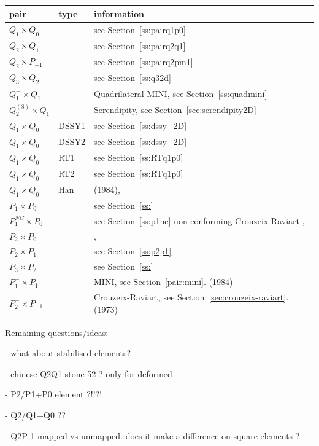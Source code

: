 \begin{tabular}{p{2cm}p{2cm}p{12cm}}
\hline
pair & type & information \\
\hline
\hline
$Q_1\times Q_0$ & & see Section~\ref{ss:pairq1p0}  \\
$Q_2\times Q_1$ & & see Section~\ref{ss:pairq2q1} \\
$Q_2\times P_{-1}$ & &  see Section~\ref{ss:pairq2pm1} \\
$Q_3\times Q_2$ & &  see Section~\ref{ss:q32d} \\
$Q_1^+\times Q_1$ & & Quadrilateral MINI, see Section~\ref{ss:quadmini} \\
$Q_2^{(8)}\times Q_1$ & & Serendipity, see Section~\ref{sec:serendipity2D} \\
$Q_1\times Q_0$ &DSSY1& see Section~\ref{ss:dssy_2D}\\
$Q_1\times Q_0$ &DSSY2& see Section~\ref{ss:dssy_2D}\\
$Q_1\times Q_0$ &RT1& see Section~\ref{ss:RTq1p0}\\
$Q_1\times Q_0$ &RT2& see Section~\ref{ss:RTq1p0}\\
$Q_1\times Q_0$ &Han& \textcite{han84} (1984), \cite{shee20}\\
$P_1\times P_0$ &  &see Section~\ref{ss:} \\
$P_1^{NC}\times P_0$ & & see Section~\ref{ss:p1nc} non conforming Crouzeix Raviart \cite{crra73}, \cite{shee20} \\
$P_2\times P_0$ & &\cite{bobf08}, \cite{cakp18} \\
$P_2\times P_1$ & &see Section~\ref{ss:p2p1}\\
$P_3\times P_2$ & &see Section~\ref{ss:} \\
$P_1^{+}\times P_{1}$ &&  MINI, see Section~\ref{pair:mini}. \textcite{arbf84} (1984) \\
$P_2^+\times P_{-1}$ && Crouzeix-Raviart, see Section~\ref{sec:crouzeix-raviart}. \textcite{crra73} (1973) \\
\hline
\end{tabular}

Remaining questions/ideas:

- what about stabilised elements?

- chinese Q2Q1 stone 52 ? only for deformed

- P2/P1+P0 element ?!!?!

- Q2/Q1+Q0 ??

- Q2P-1 mapped vs unmapped. does it make a difference on square elements ?

